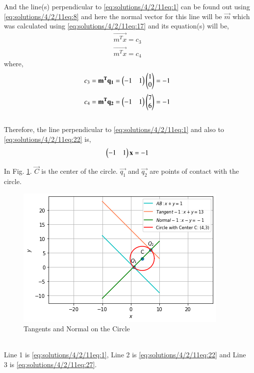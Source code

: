 And the line(s) perpendicular to \eqref{eq:solutions/4/2/11eq:1} can be found out using \eqref{eq:solutions/4/2/11eq:8} and here the normal vector for this line will be $\vec{m}$ which was calculated using \eqref{eq:solutions/4/2/11eq:17} and its equation(s) will be,
\begin{align}
    \vec{m^Tx} = c_3 \label{eq:solutions/4/2/11eq:23}
\end{align}
\begin{align}
    \vec{m^Tx} = c_4 \label{eq:solutions/4/2/11eq:24}
\end{align}
where,
\begin{align}
c_3 = \mathbf{m^Tq_1} = \begin{pmatrix}-1 & 1\end{pmatrix}\begin{pmatrix}1 \\ 0\end{pmatrix} = -1 \label{eq:solutions/4/2/11eq:25}
\end{align}
\begin{align}
c_4 = \mathbf{m^Tq_2} =  \begin{pmatrix}-1 & 1\end{pmatrix}\begin{pmatrix}7 \\ 6\end{pmatrix} = -1  \label{eq:solutions/4/2/11eq:26}
\end{align}\\
Therefore, the line perpendicular to \eqref{eq:solutions/4/2/11eq:1} and also to \eqref{eq:solutions/4/2/11eq:22} is,
\begin{align}
 \begin{pmatrix}-1 & 1\end{pmatrix}\mathbf{x} = -1 \label{eq:solutions/4/2/11eq:27}   
\end{align}

In Fig. \ref{eq:solutions/4/2/11Fig.1}. $\vec{C}$ is the center of the circle. $\vec{q_1}$ and $\vec{q_2}$ are points of contact with the circle. 
\begin{figure}[!ht]
\centering
    \includegraphics[width=\columnwidth]{./solutions/4/2/11/Figure.png}
    \caption{Tangents and Normal on the Circle}
    \label{eq:solutions/4/2/11Fig.1}
\end{figure}
\\
Line 1 is \eqref{eq:solutions/4/2/11eq:1}, Line 2 is \eqref{eq:solutions/4/2/11eq:22} and Line 3 is \eqref{eq:solutions/4/2/11eq:27}.
